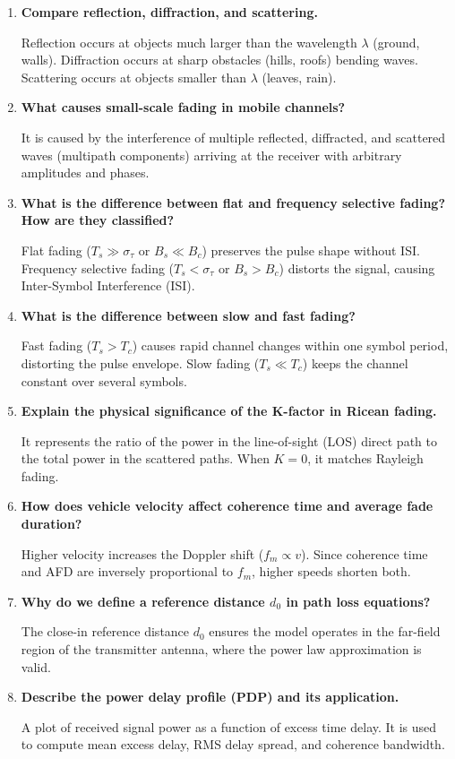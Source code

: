 \documentclass[12pt,a4paper]{article}
\newcommand{\Q}[1]{\textbf{#1}\par\noindent\ignorespaces}
\begin{document}
\begin{tcolorbox}[exambox, title={\textbf{Frequently Asked / Viva Questions}}]
\begin{enumerate}[topsep=0pt, label=\textbf{Q\arabic*.}, itemsep=5pt]
  \item \Q{Compare reflection, diffraction, and scattering.}
    Reflection occurs at objects much larger than the wavelength $\lambda$ (ground, walls). Diffraction occurs at sharp obstacles (hills, roofs) bending waves. Scattering occurs at objects smaller than $\lambda$ (leaves, rain).
  \item \Q{What causes small-scale fading in mobile channels?}
    It is caused by the interference of multiple reflected, diffracted, and scattered waves (multipath components) arriving at the receiver with arbitrary amplitudes and phases.
  \item \Q{What is the difference between flat and frequency selective fading? How are they classified?}
    Flat fading ($T_s \gg \sigma_\tau$ or $B_s \ll B_c$) preserves the pulse shape without ISI. Frequency selective fading ($T_s < \sigma_\tau$ or $B_s > B_c$) distorts the signal, causing Inter-Symbol Interference (ISI).
  \item \Q{What is the difference between slow and fast fading?}
    Fast fading ($T_s > T_c$) causes rapid channel changes within one symbol period, distorting the pulse envelope. Slow fading ($T_s \ll T_c$) keeps the channel constant over several symbols.
  \item \Q{Explain the physical significance of the K-factor in Ricean fading.}
    It represents the ratio of the power in the line-of-sight (LOS) direct path to the total power in the scattered paths. When $K=0$, it matches Rayleigh fading.
  \item \Q{How does vehicle velocity affect coherence time and average fade duration?}
    Higher velocity increases the Doppler shift ($f_m \propto v$). Since coherence time and AFD are inversely proportional to $f_m$, higher speeds shorten both.
  \item \Q{Why do we define a reference distance $d_0$ in path loss equations?}
    The close-in reference distance $d_0$ ensures the model operates in the far-field region of the transmitter antenna, where the power law approximation is valid.
  \item \Q{Describe the power delay profile (PDP) and its application.}
    A plot of received signal power as a function of excess time delay. It is used to compute mean excess delay, RMS delay spread, and coherence bandwidth.

\end{enumerate}
\end{tcolorbox}
\end{document}
